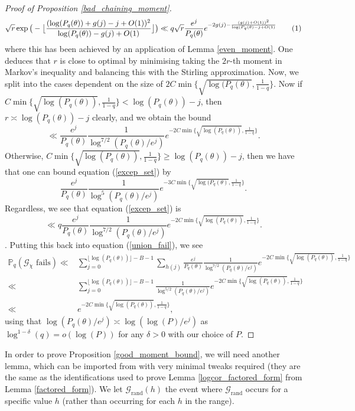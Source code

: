 \documentclass[10pt,a4paper]{amsart}
\numberwithin{equation}{section}
\newcommand\numberthis{\addtocounter{equation}{1}\tag{\theequation}}
\begin{document}
\begin{proof}[Proof of Proposition \ref{bad_chaining_moment}]
    \begin{align*}
        \sqrt{r}\exp\big(-\big\lfloor\frac{(\log(P_q(\theta))+g(j)-j+O(1))^2}{\log(P_q(\theta))-g(j)+O(1)}\big\rfloor\big) \ll q\sqrt{r}\frac{e^j}{P_q(\theta)}e^{-2g(j)-\frac{(g(j)+O(1))^2}{\log(P_q(\theta)-j+O(1)}} \numberthis \label{excep_set}
    \end{align*}
    where this has been achieved by an application of Lemma \ref{even_moment}. One deduces that $r$ is close to optimal by minimising taking the $2r$-th moment in Markov's inequality and balancing this with the Stirling approximation. Now, we split into the cases dependent on the size of $2C\min\{\sqrt{\log(P_q(\theta)},\frac{1}{1-q}\}$. Now if $C\min\{\sqrt{\log(P_q(\theta))},\frac{1}{1-q}\} < \log(P_q(\theta))-j$, then $r \asymp \log(P_q(\theta))-j$ clearly, and we obtain the bound $$\ll \frac{e^j}{P_q(\theta)}\frac{1}{\log^{7/2}(P_q(\theta)/e^j)}e^{-2C\min\{\sqrt{\log(P_q(\theta))},\frac{1}{1-q}\}}.$$ Otherwise, $C\min\{\sqrt{\log(P_q(\theta))},\frac{1}{1-q}\} \geq \log(P_q(\theta))-j$, then we have that one can bound equation (\ref{excep_set}) by $$\frac{e^j}{P_q(\theta)}\frac{1}{\log^{5}(P_q(\theta)/e^j)}e^{-3C\min\{\sqrt{\log(P_q(\theta)},\frac{1}{1-q}\}}.$$
    Regardless, we see that equation (\ref{excep_set}) is $$\ll q\frac{e^j}{P_q(\theta)}\frac{1}{\log^{7/2}(P_q(\theta)/e^j)}e^{-2C\min\{\sqrt{\log(P_q(\theta))},\frac{1}{1-q}\}}.$$. Putting this back into equation (\ref{union_fail}), we see
    \begin{align*}
        \mathbb{P}_q(\mathcal{G}_\chi \text{ fails}) \ll& \sum_{j=0}^{\lfloor\log(P_q(\theta))\rfloor -B-1}\sum_{h(j)}\frac{e^j}{P_q(\theta)}\frac{1}{\log^{7/2}(P_q(\theta)/e^j)}e^{-2C\min\{\sqrt{\log(P_q(\theta))},\frac{1}{1-q}\}} \\
        \ll& \sum_{j=0}^{\lfloor\log(P_q(\theta))\rfloor -B-1}\frac{1}{\log^{5/2}(P_q(\theta)/e^j)}e^{-2C\min\{\sqrt{\log(P_q(\theta))},\frac{1}{1-q}\}} \\
        \ll& e^{-2C\min\{\sqrt{\log(P_q(\theta))},\frac{1}{1-q}\}},
    \end{align*}
    using that $\log(P_q(\theta)/e^j) \asymp \log(\log(P)/e^j)$ as $\log^{1-\delta}(q) = o(\log(P))$ for any $\delta > 0$ with our choice of $P$.
\end{proof}
In order to prove Proposition \ref{good_moment_bound}, we will need another lemma, which can be imported from \cite{harper2019partition} with very minimal tweaks required (they are the same as the identifications used to prove Lemma \ref{logcor_factored_form} from Lemma \ref{factored_form}). We let $\mathcal{G}_{\text{rand}}(h)$ the event where $\mathcal{G}_{\text{rand}}$ occurs for a specific value $h$ (rather than occurring for each $h$ in the range).
\end{document}
